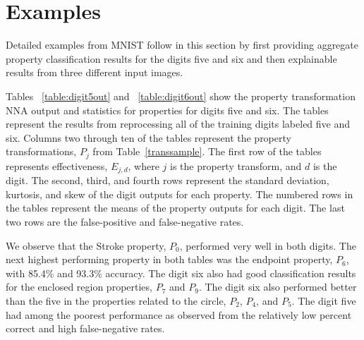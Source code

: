 \documentclass[conference]{IEEEtran}
\begin{document}
\section{Examples}

Detailed examples from MNIST follow in this section by first providing aggregate property classification results for the digits five and six and then explainable results from three different input images.

Tables ~\ref{table:digit5out} and ~\ref{table:digit6out} show the property transformation NNA output and statistics for properties for digits five and six.  The tables represent the results from reprocessing all of the training digits labeled five and six.  Columns two through ten of the tables represent the property transformations, $P_j$ from Table~\ref{transsample}.  The first row of the tables represents effectiveness, $E_{j,d}$, where $j$ is the property transform, and $d$ is the digit.  The second, third, and fourth rows represent the standard deviation, kurtosis, and skew of the digit outputs for each property.  The numbered rows in the tables represent the means of the property outputs for each digit.  The last two rows are the false-positive and false-negative rates.

We observe that the Stroke property, $P_0$, performed very well in both digits.  The next highest performing property in both tables was the endpoint property, $P_6$, with 85.4\% and 93.3\% accuracy.  The digit six also had good classification results for the enclosed region properties, $P_7$ and $P_9$.  The digit six also performed better than the five in the properties related to the circle, $P_2$, $P_4$, and $P_5$.  The digit five had among the poorest performance as observed from the relatively low percent correct and high false-negative rates.
\end{document}
